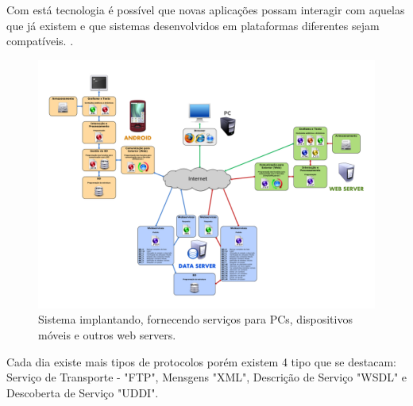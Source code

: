 \documentclass[a4paper, 12pt]{article}
\begin{document}
Com está tecnologia é possível que novas aplicações possam interagir com aquelas que já existem e que sistemas desenvolvidos em plataformas diferentes sejam compatíveis. 
\cite{webservece}.
\begin{figure}[H]
	\centering
	\includegraphics[scale=0.14]{Imagens/webservice.png}
	\caption{Sistema implantando, fornecendo serviços para PCs, dispositivos móveis e outros web servers.}
	\label{wbs}
\end{figure} 

Cada dia existe mais tipos de protocolos porém existem 4 tipo que se destacam: Serviço de Transporte - "FTP", Mensgens "XML", Descrição de Serviço "WSDL"  e Descoberta de Serviço "UDDI".
\end{document}
